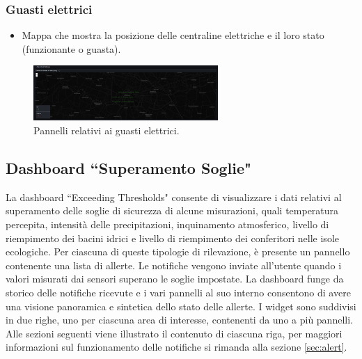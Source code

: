 \documentclass[8pt]{article}
\begin{document}
\subsubsection{Guasti elettrici}
\begin{itemize}
\setlength\itemsep{0em}
    \item Mappa che mostra la posizione delle centraline elettriche e il loro stato (funzionante o guasta).
\end{itemize}
\begin{figure}[H]
    \centering
    \includegraphics[width=7cm]{images_mu/electrical_failure.png}
    \caption{Pannelli relativi ai guasti elettrici.}
    \label{fig:Pannelli relativi ai guasti elettrici}
\end{figure}
\subsection{Dashboard ``Superamento Soglie"} \label{sec:thresholds}
La dashboard ``Exceeding Thresholds" consente di visualizzare i dati relativi al superamento delle soglie di sicurezza di alcune misurazioni, quali temperatura percepita, intensità delle precipitazioni, inquinamento atmosferico, livello di riempimento dei bacini idrici e livello di riempimento dei conferitori nelle isole ecologiche. Per ciascuna di queste tipologie di rilevazione, è presente un pannello contenente una lista di allerte. Le notifiche vengono inviate all'utente quando i valori misurati dai sensori superano le soglie impostate. La dashboard funge da storico delle notifiche ricevute e i vari pannelli al suo interno consentono di avere una visione panoramica e sintetica dello stato delle allerte. I widget sono suddivisi in due righe, uno per ciascuna area di interesse, contenenti da uno a più pannelli. Alle sezioni seguenti viene illustrato il contenuto di ciascuna riga, per maggiori informazioni sul funzionamento delle notifiche si rimanda alla sezione \ref{sec:alert}.
\end{document}
